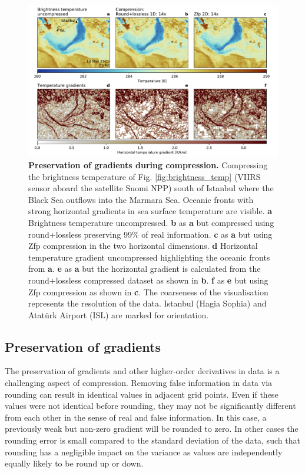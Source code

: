 \begin{figure}[tbhp]
	\includegraphics[width=1\textwidth]{Figures/compression/brightness_temp_grad.pdf}
	\caption{\textbf{Preservation of gradients during compression.} Compressing the brightness temperature
	of Fig. \ref{fig:brightness_temp} (VIIRS sensor aboard the satellite Suomi NPP) south of Istanbul where
	the Black Sea outflows into the Marmara Sea. Oceanic fronts with strong horizontal gradients in sea surface
	temperature are visible. \textbf{a} Brightness temperature uncompressed. \textbf{b} as \textbf{a} but compressed
	using round+lossless preserving 99\% of real information. \textbf{c} as \textbf{a} but using Zfp compression in the
	two horizontal dimensions. \textbf{d} Horizontal temperature gradient uncompressed highlighting the oceanic
	fronts from \textbf{a}. \textbf{e} as \textbf{a} but the horizontal gradient is calculated from the round+lossless
	compressed dataset as shown in \textbf{b}. \textbf{f} as \textbf{e} but using Zfp compression as shown in \textbf{c}. 
	The coarseness of the visualisation represents the resolution of the data.
	Istanbul (Hagia Sophia) and Atatürk Airport (ISL) are marked for orientation.}
	\label{fig:compression_gradients}
\end{figure}

\subsection{Preservation of gradients}

The preservation of gradients and other higher-order derivatives in data is a challenging aspect of compression.
Removing false information in data via rounding can result in identical values in adjacent grid points. Even if these values
were not identical before rounding, they may not be significantly different from each other in the sense of real and false
information. In this case, a previously weak but non-zero gradient will be rounded to zero. In other cases the rounding error
is small compared to the standard deviation of the data, such that rounding has a negligible impact on the variance as
values are independently equally likely to be round up or down.

